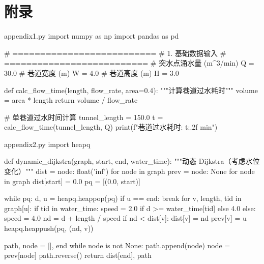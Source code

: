 \documentclass[withoutpreface,bwprint]{cumcmthesis}
\begin{document}
\newpage
\section*{附录}
\begin{filecontents*}[overwrite]{appendix1.py}
import numpy as np
import pandas as pd

# ==========================
# 1. 基础数据输入
# ==========================
# 突水点涌水量 (m^3/min)
Q = 30.0
# 巷道宽度 (m)
W = 4.0
# 巷道高度 (m)
H = 3.0

def calc_flow_time(length, flow_rate, area=0.4):
    """计算巷道过水耗时"""
    volume = area * length
    return volume / flow_rate

# 单巷道过水时间计算
tunnel_length = 150.0
t = calc_flow_time(tunnel_length, Q)
print(f"巷道过水耗时: {t:.2f} min")
\end{filecontents*}
\begin{filecontents*}[overwrite]{appendix2.py}
import heapq

def dynamic_dijkstra(graph, start, end, water_time):
    """动态 Dijkstra（考虑水位变化）"""
    dist = {node: float('inf') for node in graph}
    prev = {node: None for node in graph}
    dist[start] = 0.0
    pq = [(0.0, start)]

    while pq:
        d, u = heapq.heappop(pq)
        if u == end:
            break
        for v, length, tid in graph[u]:
            if tid in water_time:
                speed = 2.0 if d >= water_time[tid] else 4.0
            else:
                speed = 4.0
            nd = d + length / speed
            if nd < dist[v]:
                dist[v] = nd
                prev[v] = u
                heapq.heappush(pq, (nd, v))

    path, node = [], end
    while node is not None:
        path.append(node)
        node = prev[node]
    path.reverse()
    return dist[end], path
\end{filecontents*}
\end{document}
